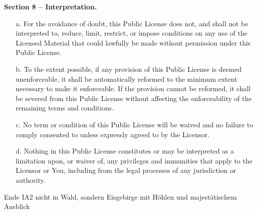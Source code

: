 \begin{center}
    \textbf{Section 8 -- Interpretation.}
\end{center}

\begin{itemize}
    \item[a.] For the avoidance of doubt, this Public License does not, and shall not be interpreted to, reduce, limit, restrict, or impose conditions on any use of the Licensed Material that could lawfully be made without permission under this Public License.

    \item[b.] To the extent possible, if any provision of this Public License is deemed unenforceable, it shall be automatically reformed to the minimum extent necessary to make it enforceable. If the provision cannot be reformed, it shall be severed from this Public License without affecting the enforceability of the remaining terms and conditions.

    \item[c.] No term or condition of this Public License will be waived and no failure to comply consented to unless expressly agreed to by the Licensor.

    \item[d.] Nothing in this Public License constitutes or may be interpreted as a limitation upon, or waiver of, any privileges and immunities that apply to the Licensor or You, including from the legal processes of any jurisdiction or authority.
\end{itemize}



Ende IA2 nicht in Wald, sondern Eisgebirge mit Höhlen und majestätischem Ausblick
